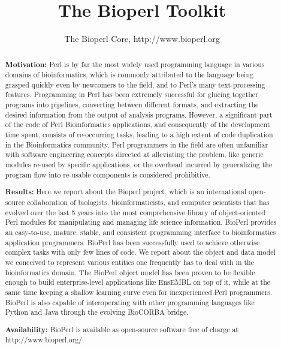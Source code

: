 \documentclass{article}
\begin{document}
\title{The Bioperl Toolkit}
\author{The Bioperl Core, http://www.bioperl.org }
\maketitle

\begin{abstract}

\textbf{Motivation:} Perl is by far the most widely used programming
language in various domains of bioinformatics, which is commonly
attributed to the language being grasped quickly even by newcomers to
the field, and to Perl's many text-processing features.  Programming in
Perl has been extremely successful for glueing together programs into
pipelines, converting between different formats, and extracting the
desired information from the output of analysis programs.  However, a
significant part of the code of Perl Bioinformatics applications, and
consequently of the development time spent, consists of re-occurring
tasks, leading to a high extent of code duplication in the
Bioinformatics community.  Perl programmers in the field are often
unfamiliar with software engineering concepts directed at alleviating
the problem, like generic modules re-used by specific applications, or
the overhead incurred by generalizing the program flow into re-usable
components is considered prohibitive.

\textbf{ Results:} Here we report about the Bioperl project, which is
an international open-source collaboration of biologists,
bioinformaticists, and computer scientists that has evolved over the
last 5 years into the most comprehensive library of object-oriented
Perl modules for manipulating and managing life science information.
BioPerl provides an easy-to-use, mature, stable, and consistent
programming interface to bioinformatics application programmers.
BioPerl has been successfully used to achieve otherwise complex tasks
with only few lines of code.  We report about the object and data
model we conceived to represent various entities one frequently has to
deal with in the bioinformatics domain.  The BioPerl object model has
been proven to be flexible enough to build enterprise-level
applications like EnsEMBL \cite{ensembl} on top of it, while at the
same time keeping a shallow learning curve even for inexperienced Perl
programmers.  BioPerl is also capable of interoperating with other
programming languages like Python and Java through the evolving
BioCORBA bridge.

{\bf Availability:} BioPerl is available as open-source software free
of charge at http://www.bioperl.org/.

\end{abstract}
\end{document}
